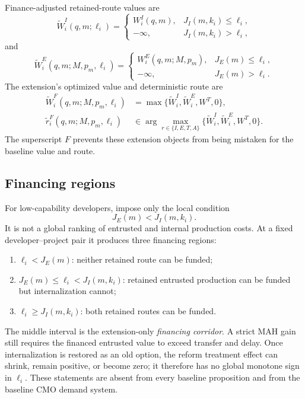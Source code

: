 Finance-adjusted retained-route values are
\begin{equation}
  \widetilde W_i^I(q,m;\ell_i)
  =
  \begin{cases}
    W_i^I(q,m),&J_I(m,k_i)\leq\ell_i,\\
    -\infty,&J_I(m,k_i)>\ell_i,
  \end{cases}
  \label{eq:ext-finance-adjusted-internal}
\end{equation}
and
\begin{equation}
  \widetilde W_i^E(q,m;M,p_m,\ell_i)
  =
  \begin{cases}
    W_i^E(q,m;M,p_m),&J_E(m)\leq\ell_i,\\
    -\infty,&J_E(m)>\ell_i.
  \end{cases}
  \label{eq:ext-finance-adjusted-entrusted}
\end{equation}
The extension's optimized value and deterministic route are
\begin{equation}
  \begin{aligned}
  \widetilde W_i^F(q,m;M,p_m,\ell_i)
  &=\max\{\widetilde W_i^I,\widetilde W_i^E,W^T,0\},\\
  \widetilde r_i^F(q,m;M,p_m,\ell_i)
  &\in\arg\max_{r\in\{I,E,T,A\}}
  \{\widetilde W_i^I,\widetilde W_i^E,W^T,0\}.
  \end{aligned}
  \label{eq:ext-finance-route-choice}
\end{equation}
The superscript \(F\) prevents these extension objects from being mistaken for
the baseline value and route.

\subsection{Financing regions}

For low-capability developers, impose only the local condition
\begin{equation}
  J_E(m)<J_I(m,k_i).
  \label{eq:ext-local-liquidity-ordering}
\end{equation}
It is not a global ranking of entrusted and internal production costs. At a
fixed developer--project pair it produces three financing regions:
\begin{enumerate}
  \item \(\ell_i<J_E(m)\): neither retained route can be funded;
  \item \(J_E(m)\leq\ell_i<J_I(m,k_i)\): retained entrusted production can be
  funded but internalization cannot;
  \item \(\ell_i\geq J_I(m,k_i)\): both retained routes can be funded.
\end{enumerate}
The middle interval is the extension-only \emph{financing corridor}. A strict
MAH gain still requires the financed entrusted value to exceed transfer and
delay. Once internalization is restored as an old option, the reform treatment
effect can shrink, remain positive, or become zero; it therefore has no global
monotone sign in \(\ell_i\). These statements are absent from every baseline
proposition and from the baseline CMO demand system.

